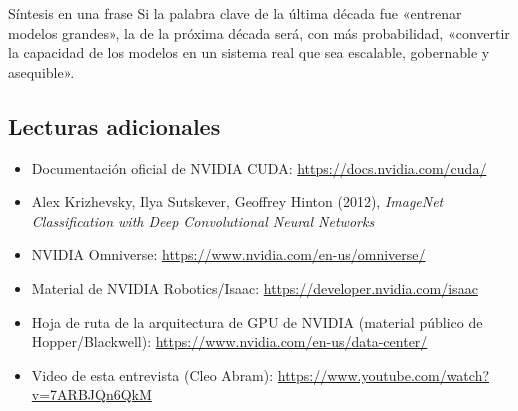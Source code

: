 \begin{importantbox}{Síntesis en una frase}
Si la palabra clave de la última década fue «entrenar modelos grandes», la de la próxima década será, con más probabilidad, «convertir la capacidad de los modelos en un sistema real que sea escalable, gobernable y asequible».
\end{importantbox}

\subsection{Lecturas adicionales}
\begin{itemize}
    \item Documentación oficial de NVIDIA CUDA: \url{https://docs.nvidia.com/cuda/}
    \item Alex Krizhevsky, Ilya Sutskever, Geoffrey Hinton (2012), \textit{ImageNet Classification with Deep Convolutional Neural Networks}
    \item NVIDIA Omniverse: \url{https://www.nvidia.com/en-us/omniverse/}
    \item Material de NVIDIA Robotics/Isaac: \url{https://developer.nvidia.com/isaac}
    \item Hoja de ruta de la arquitectura de GPU de NVIDIA (material público de Hopper/Blackwell): \url{https://www.nvidia.com/en-us/data-center/}
    \item Video de esta entrevista (Cleo Abram): \url{https://www.youtube.com/watch?v=7ARBJQn6QkM}
\end{itemize}



